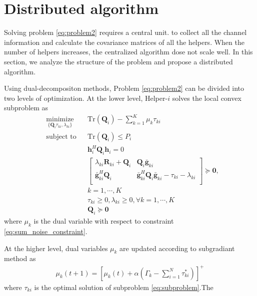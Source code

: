 \documentclass[journal]{IEEEtran}
\begin{document}
\section{Distributed algorithm} \label{sec:distributed algorithm}
Solving problem \eqref{eq:problem2} requires a central unit. to collect all the channel information and calculate the covariance matrices of all the helpers. When the number of helpers increases, the centralized algorithm dose not scale well. 
In this section, we analyze the structure of the problem and propose a distributed algorithm. 

Using dual-decompositon methods, Problem \eqref{eq:problem2} can be divided into two levels of optimization. At the lower level,  Helper-$i$ solves the local convex subproblem as
\begin{equation}
\begin{aligned} \label{eq:subproblem}
& \underset{\{\mathbf{Q}_i \tau_{ki},\lambda_{ki}\}}{\text{minimize}}
& & \mathrm{Tr}(\mathbf{Q}_i) - \sum_{k = 1}^{K}\mu_k\tau_{ki}\\
& \text{subject to}
& & \mathrm{Tr}(\mathbf{Q}_i) \leq P_i\\
&&& \mathbf{h}_i^H \mathbf{Q}_i \mathbf{h}_i= 0\\
&&& \left[ {\begin{array}{cc}
	\lambda_{ki}\mathbf{R}_{ki}+\mathbf{Q}_{i}  & \mathbf{Q}_{i}\bar{\mathbf{g}}_{ki} \\
	\bar{\mathbf{g}}_{ki}^H\mathbf{Q}_{i}& \bar{\mathbf{g}}_{ki}^H\mathbf{Q}_i\bar{\mathbf{g}}_{ki}- \tau_{ki} -\lambda_{ki}\\
	\end{array} } \right] \succeq \mathbf{0},\\
&&& k = 1,\cdots,K\\
&&&\tau_{ki} \geq 0, \lambda_{ki} \geq 0, \forall k = 1, \cdots,K\\
&&&\mathbf{Q}_i \succeq \mathbf{0}
\end{aligned}
\end{equation}
where $\mu_k$ is the dual variable with respect to constraint \eqref{eq:sum_noise_constraint}.

At the higher level, dual variables $\mu_k$ are updated according to subgradiant method as
\begin{eqnarray}
\mu_k(t+1) = \left[\mu_k(t) + \alpha\left(\Gamma_k - \sum_{i = 1}^{N}\tau_{ki}^*\right)\right]^+ 
\end{eqnarray}
where $\tau_{ki}$ is the optimal solution of  subproblem \eqref{eq:subproblem}.The 
\end{document}
